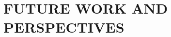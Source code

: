 \section{\texorpdfstring{\MakeUppercase{future work and perspectives}}{future work and perspectives}}
\label{sec:chapter-future}
